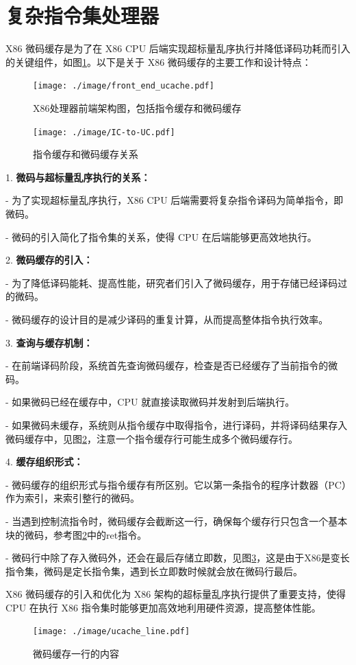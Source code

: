 \section{复杂指令集处理器}

X86 微码缓存是为了在 X86 CPU 后端实现超标量乱序执行并降低译码功耗而引入的关键组件\cite{solomonMicrooperationCachePower2001}，如图\ref{img:front_end_ucache}。以下是关于 X86 微码缓存的主要工作和设计特点：

\begin{figure}[h]
  \centering
  \texttt{[image: ./image/front\_end\_ucache.pdf]}
  \caption{X86处理器前端架构图，包括指令缓存和微码缓存}
  \label{img:front_end_ucache}
\end{figure}

\begin{figure}[h]
  \centering
  \texttt{[image: ./image/IC-to-UC.pdf]}
  \caption{指令缓存和微码缓存关系}
  \label{img:IC_to_UC}
\end{figure}

1. \textbf{微码与超标量乱序执行的关系：}

   - 为了实现超标量乱序执行，X86 CPU 后端需要将复杂指令译码为简单指令，即微码。

   - 微码的引入简化了指令集的关系，使得 CPU 在后端能够更高效地执行。

2. \textbf{微码缓存的引入：}

- 为了降低译码能耗、提高性能，研究者们引入了微码缓存，用于存储已经译码过的微码。

- 微码缓存的设计目的是减少译码的重复计算，从而提高整体指令执行效率。

3. \textbf{查询与缓存机制：}
  
- 在前端译码阶段，系统首先查询微码缓存，检查是否已经缓存了当前指令的微码。

- 如果微码已经在缓存中，CPU 就直接读取微码并发射到后端执行。

- 如果微码未缓存，系统则从指令缓存中取得指令，进行译码，并将译码结果存入微码缓存中，见图\ref{img:IC_to_UC}，注意一个指令缓存行可能生成多个微码缓存行。

4. \textbf{缓存组织形式：}

- 微码缓存的组织形式与指令缓存有所区别。它以第一条指令的程序计数器（PC）作为索引，来索引整行的微码。

- 当遇到控制流指令时，微码缓存会截断这一行，确保每个缓存行只包含一个基本块的微码，参考图\ref{img:IC_to_UC}中的ret指令。

- 微码行中除了存入微码外，还会在最后存储立即数，见图\ref{img:ucache_line}，这是由于X86是变长指令集，微码是定长指令集，遇到长立即数时候就会放在微码行最后。

X86 微码缓存的引入和优化为 X86 架构的超标量乱序执行提供了重要支持，使得 CPU 在执行 X86 指令集时能够更加高效地利用硬件资源，提高整体性能。

\begin{figure}[h]
  \centering
  \texttt{[image: ./image/ucache\_line.pdf]}
  \caption{微码缓存一行的内容}
  \label{img:ucache_line}
\end{figure}
